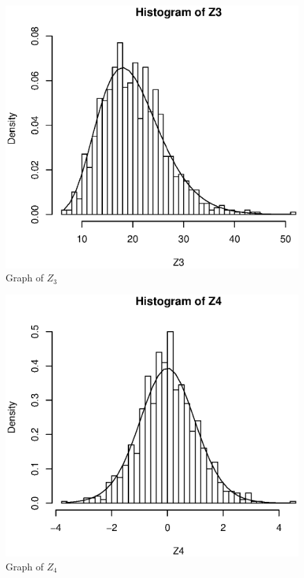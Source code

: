 \documentclass[a4paper,11pt,fleqn]{article}
\begin{document}
\begin{figure}[h!]
\centering
\includegraphics[scale=0.8]{Z320.eps}
\caption{Graph of $Z_3$}
\label{fig: $Z_3$}
\end{figure}
\vskip 0.5cm

\begin{figure}[h!]
\centering
\includegraphics[scale=0.8]{Z4_20.eps}
\caption{Graph of $Z_4$}
\label{fig: $Z_4$}
\end{figure}
\end{document}
